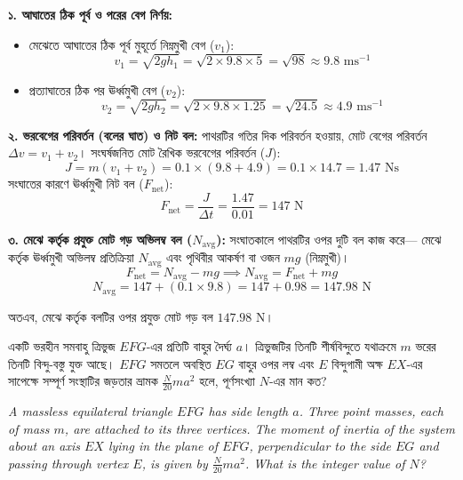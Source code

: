 \documentclass[12pt, a4paper]{article}
\begin{document}
\begin{tcolorbox}[solutionbox={সমাধান (Solution)}]
\noindent
\textbf{১. আঘাতের ঠিক পূর্ব ও পরের বেগ নির্ণয়:}
\begin{itemize}[leftmargin=1.5em, itemsep=0.2em]
    \item মেঝেতে আঘাতের ঠিক পূর্ব মুহূর্তে নিম্নমুখী বেগ ($v_1$):
    $$v_1 = \sqrt{2 g h_1} = \sqrt{2 \times 9.8 \times 5} = \sqrt{98} \approx 9.8\text{ ms}^{-1}$$
    \item প্রত্যাঘাতের ঠিক পর ঊর্ধ্বমুখী বেগ ($v_2$):
    $$v_2 = \sqrt{2 g h_2} = \sqrt{2 \times 9.8 \times 1.25} = \sqrt{24.5} \approx 4.9\text{ ms}^{-1}$$
\end{itemize}

\vspace{0.5em}
\textbf{২. ভরবেগের পরিবর্তন (বলের ঘাত) ও নিট বল:}
পাথরটির গতির দিক পরিবর্তন হওয়ায়, মোট বেগের পরিবর্তন $\Delta v = v_1 + v_2$। 
সংঘর্ষজনিত মোট রৈখিক ভরবেগের পরিবর্তন ($J$):
$$J = m (v_1 + v_2) = 0.1 \times (9.8 + 4.9) = 0.1 \times 14.7 = 1.47\text{ Ns}$$
সংঘাতের কারণে ঊর্ধ্বমুখী নিট বল ($F_{\text{net}}$):
$$F_{\text{net}} = \frac{J}{\Delta t} = \frac{1.47}{0.01} = 147\text{ N}$$

\vspace{0.5em}
\textbf{৩. মেঝে কর্তৃক প্রযুক্ত মোট গড় অভিলম্ব বল ($N_{\text{avg}}$):}
সংঘাতকালে পাথরটির ওপর দুটি বল কাজ করে— মেঝে কর্তৃক ঊর্ধ্বমুখী অভিলম্ব প্রতিক্রিয়া $N_{\text{avg}}$ এবং পৃথিবীর আকর্ষণ বা ওজন $mg$ (নিম্নমুখী)।
$$F_{\text{net}} = N_{\text{avg}} - mg \implies N_{\text{avg}} = F_{\text{net}} + mg$$
$$N_{\text{avg}} = 147 + (0.1 \times 9.8) = 147 + 0.98 = 147.98\text{ N}$$

অতএব, মেঝে কর্তৃক বলটির ওপর প্রযুক্ত মোট গড় বল $147.98\text{ N}$।
\end{tcolorbox}
\vspace{1em}
\begin{tcolorbox}[questionbox={প্রশ্ন (Question) 45}]
\noindent
একটি ভরহীন সমবাহু ত্রিভুজ $EFG$-এর প্রতিটি বাহুর দৈর্ঘ্য $a$। ত্রিভুজটির তিনটি শীর্ষবিন্দুতে যথাক্রমে $m$ ভরের তিনটি বিন্দু-বস্তু যুক্ত আছে। $EFG$ সমতলে অবস্থিত $EG$ বাহুর ওপর লম্ব এবং $E$ বিন্দুগামী অক্ষ $EX$-এর সাপেক্ষে সম্পূর্ণ সংস্থাটির জড়তার ভ্রামক $\frac{N}{20} m a^2$ হলে, পূর্ণসংখ্যা $N$-এর মান কত?

\vspace{0.8em}
\begin{english}
\noindent\textit{\color{darkgray}
A massless equilateral triangle $EFG$ has side length $a$. Three point masses, each of mass $m$, are attached to its three vertices. The moment of inertia of the system about an axis $EX$ lying in the plane of $EFG$, perpendicular to the side $EG$ and passing through vertex $E$, is given by $\frac{N}{20} m a^2$. What is the integer value of $N$?
}
\end{english}
\end{tcolorbox}
\end{document}
